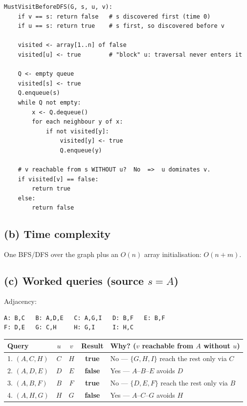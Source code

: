 \documentclass[11pt]{article}
\begin{document}
\begin{minipage}{\linewidth}
\begin{Verbatim}[fontsize=\small]
MustVisitBeforeDFS(G, s, u, v):
    if v == s: return false   # s discovered first (time 0)
    if u == s: return true    # s first, so discovered before v

    visited <- array[1..n] of false
    visited[u] <- true        # "block" u: traversal never enters it

    Q <- empty queue
    visited[s] <- true
    Q.enqueue(s)
    while Q not empty:
        x <- Q.dequeue()
        for each neighbour y of x:
            if not visited[y]:
                visited[y] <- true
                Q.enqueue(y)

    # v reachable from s WITHOUT u?  No  =>  u dominates v.
    if visited[v] == false:
        return true
    else:
        return false
\end{Verbatim}
\end{minipage}

\subsection*{(b) Time complexity}

One BFS/DFS over the graph plus an $O(n)$ array initialisation: $\boxed{O(n + m)}$.

\subsection*{(c) Worked queries (source $s=A$)}

Adjacency:
\begin{verbatim}
A: B,C   B: A,D,E   C: A,G,I   D: B,F   E: B,F
F: D,E   G: C,H     H: G,I     I: H,C
\end{verbatim}

\begin{center}
\begin{tabular}{l c c c p{6.4cm}}
\toprule
\rowcolor{white}
Query & $u$ & $v$ & Result & Why? ($v$ reachable from $A$ without $u$) \\
\midrule
1. $(A,C,H)$ & $C$ & $H$ & \textbf{true}  & No --- $\{G,H,I\}$ reach the rest only via $C$ \\
2. $(A,D,E)$ & $D$ & $E$ & \textbf{false} & Yes --- $A$--$B$--$E$ avoids $D$ \\
3. $(A,B,F)$ & $B$ & $F$ & \textbf{true}  & No --- $\{D,E,F\}$ reach the rest only via $B$ \\
4. $(A,H,G)$ & $H$ & $G$ & \textbf{false} & Yes --- $A$--$C$--$G$ avoids $H$ \\
\bottomrule
\end{tabular}
\end{center}
\end{document}
